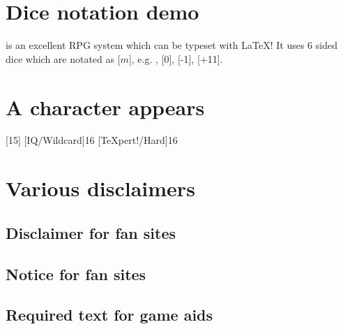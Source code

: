\documentclass{article}
\begin{document}
\tableofcontents

\section{Dice notation demo}
\label{sec:dice-notation-demo}

\gurps is an excellent RPG system which can be typeset with \LaTeX{}! It uses 6
sided dice which are notated as [$m$], e.g. , [0], [-1], [+11].

\section{A character appears}
\label{sec:character-appears}

\begin{character}
  [15]
  [IQ/Wildcard]{16}
  [\TeX pert!/Hard]{16}
\end{character}


\section{Various disclaimers}
\label{sec:various-disclaimers}

\subsection{Disclaimer for fan sites}
\label{sec:disclaimer-fan-sites}

\SJGamesOnlinePolicyDisclaimer

\subsection{Notice for fan sites}
\label{sec:disclaimer-fan-sites}

\SJGamesOnlinePolicyNotice

\subsection{Required text for game aids}
\label{sec:disclaimer-fan-sites}

\end{document}

